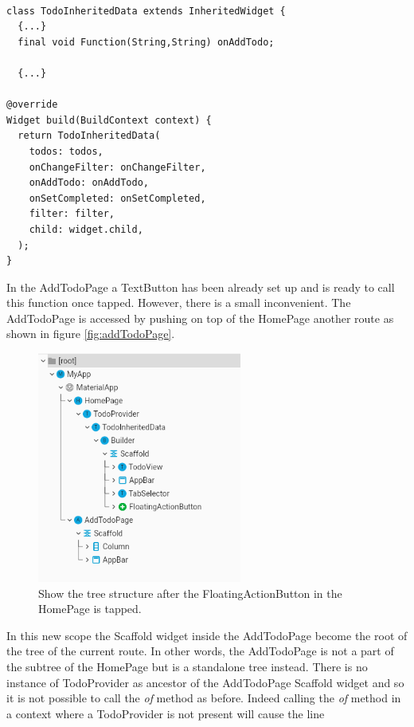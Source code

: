 \begin{verbatim}

class TodoInheritedData extends InheritedWidget {
  {...}
  final void Function(String,String) onAddTodo;

  {...}

@override
Widget build(BuildContext context) {
  return TodoInheritedData(
    todos: todos,
    onChangeFilter: onChangeFilter,
    onAddTodo: onAddTodo,
    onSetCompleted: onSetCompleted,
    filter: filter,
    child: widget.child,
  );
}
\end{verbatim}

In the AddTodoPage a TextButton has been already set up and is ready to call this function once tapped. However, there is a small inconvenient. The AddTodoPage is accessed by pushing on top of the HomePage another route as shown in figure \ref{fig:addTodoPage}. 

\begin{figure}[H]
    \centering
    \includegraphics[width=0.6\textwidth]{Images/tree_structure_on_AddTodoPage.png}
    \caption{Show the tree structure after the FloatingActionButton in the HomePage is tapped.}
    \label{fig:add_todo_page_tree_structure}
\end{figure}


In this new scope the Scaffold widget inside the AddTodoPage become the root of the tree of the current route. In other words, the AddTodoPage is not a part of the subtree of the HomePage but is a standalone tree instead. There is no instance of TodoProvider as ancestor of the AddTodoPage Scaffold widget and so it is not possible to call the \textit{of} method as before. Indeed calling the \textit{of} method in a context where a TodoProvider is not present will cause the line
\mbox{}\\


